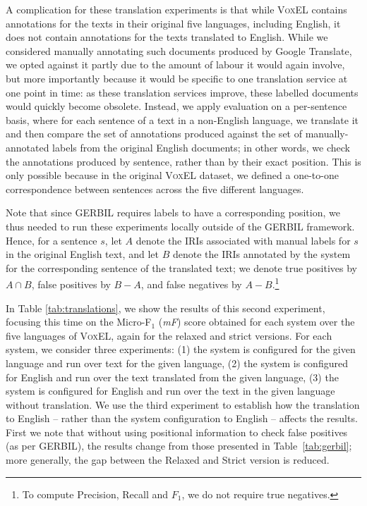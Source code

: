 \documentclass{llncs}
\begin{document}
A complication for these translation experiments is that while \textsc{VoxEL} contains annotations for the texts in their original five languages, including English, it does not contain annotations for the texts translated to English. While we considered manually annotating such documents produced by Google Translate, we opted against it partly due to the amount of labour it would again involve, but more importantly because it would be specific to one translation service at one point in time: as these translation services improve, these labelled documents would quickly become obsolete. Instead, we apply evaluation on a per-sentence basis, where for each sentence of a text in a non-English language, we translate it and then compare the set of annotations produced against the set of manually-annotated labels from the original English documents; in other words, we check the annotations produced by sentence, rather than by their exact position. This is only possible because in the original \textsc{VoxEL} dataset, we defined a one-to-one correspondence between sentences across the five different languages. 

Note that since GERBIL requires labels to have a corresponding position, we thus needed to run these experiments locally outside of the GERBIL framework. Hence, for a sentence $s$, let $A$ denote the IRIs associated with manual labels for $s$ in the original English text, and let $B$ denote the IRIs annotated by the system for the corresponding sentence of the translated text; we denote true positives by $A \cap B$, false positives by $B - A$, and false negatives by $A - B$.\footnote{To compute Precision, Recall and $F_1$, we do not require true negatives.}

\newcommand{\blank}{\underline{\hspace{0.5em}}}

In Table \ref{tab:translations}, we show the results of this second experiment, focusing this time on the Micro-F$_1$ (\textit{mF}) score obtained for each system over the five languages of \textsc{VoxEL}, again for the relaxed and strict versions. For each system, we consider three experiments: (1) the system is configured for the given language and run over text for the given language, (2) the system is configured for English and run over the text translated from the given language, (3) the system is configured for English and run over the text in the given language without translation. We use the third experiment to establish how the translation to English -- rather than the system configuration to English -- affects the results. First we note that without using positional information to check false positives (as per GERBIL), the results change from those presented in Table~\ref{tab:gerbil}; more generally, the gap between the Relaxed and Strict version is reduced. 
\end{document}
